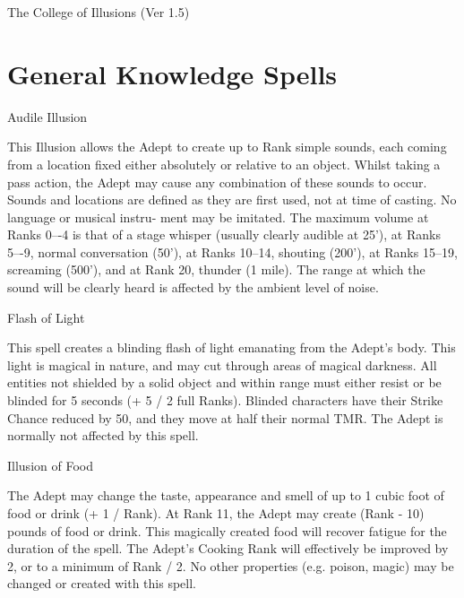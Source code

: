 \begin{Chapter}{The College of Illusions (Ver 1.5)}
\section{General Knowledge Spells}

\begin{spell}[G-1]{Audile Illusion}

\begin{effects}
This Illusion allows the Adept to create up to Rank simple sounds,
each coming from a location fixed either absolutely or relative to an
object.  Whilst taking a pass action, the Adept may cause any
combination of these sounds to occur.  Sounds and locations are
defined as they are first used, not at time of casting.  No language
or musical instru- ment may be imitated.  The maximum volume at Ranks
0–-4 is that of a stage whisper (usually clearly audible at 25’), at
Ranks 5–-9, normal conversation (50’), at Ranks 10–14, shouting
(200’), at Ranks 15–19, screaming (500’), and at Rank 20, thunder (1
mile). The range at which the sound will be clearly heard is affected
by the ambient level of noise.
\end{effects}
\end{spell}

\begin{spell}[G-2]{Flash of Light}

\begin{effects}
This spell creates a blinding flash of light emanating from the
Adept’s body.  This light is magical in nature, and may cut through
areas of magical darkness.  All entities not shielded by a solid
object and within range must either resist or be blinded for 5 seconds
(+ 5 / 2 full Ranks).  Blinded characters have their Strike Chance
reduced by 50, and they move at half their normal TMR.  The Adept is
normally not affected by this spell.
\end{effects}
\end{spell}

\begin{spell}[G-3]{Illusion of Food}

\begin{effects}
The Adept may change the taste, appearance and smell of up to 1 cubic
foot of food or drink (+ 1 / Rank).  At Rank 11, the Adept may create
(Rank - 10) pounds of food or drink.  This magically created food will
recover fatigue for the duration of the spell.  The Adept’s Cooking
Rank will effectively be improved by 2, or to a minimum of Rank / 2.
No other properties (e.g.  poison, magic) may be changed or created
with this spell.
\end{effects}
\end{spell}


\end{Chapter}
